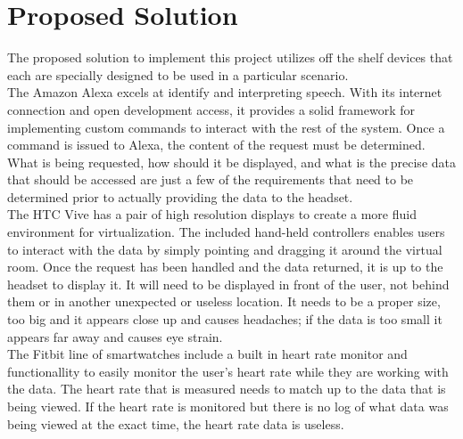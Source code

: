 \documentclass[onecolumn, draftclsnofoot,10pt, compsoc, letterpaper]{IEEEtran}
\begin{document}
\section{Proposed Solution}
The proposed solution to implement this project utilizes off the shelf devices that each are specially designed to be used in a particular scenario.
\\
The Amazon Alexa excels at identify and interpreting speech. With its internet connection and open development access, it provides a solid framework for implementing custom commands to interact with the rest of the system. Once a command is issued to Alexa, the content of the request must be determined. What is being requested, how should it be displayed, and what is the precise data that should be accessed are just a few of the requirements that need to be determined prior to actually providing the data to the headset.
\\
The HTC Vive has a pair of high resolution displays to create a more fluid environment for virtualization. The included hand-held controllers enables users to interact with the data by simply pointing and dragging it around the virtual room. Once the request has been handled and the data returned, it is up to the headset to display it. It will need to be displayed in front of the user, not behind them or in another unexpected or useless location. It needs to be a proper size, too big and it appears close up and causes headaches; if the data is too small it appears far away and causes eye strain.
\\
The Fitbit line of smartwatches include a built in heart rate monitor and functionallity to easily monitor the user's heart rate while they are working with the data. The heart rate that is measured needs to match up to the data that is being viewed. If the heart rate is monitored but there is no log of what data was being viewed at the exact time, the heart rate data is useless. 
\end{document}
